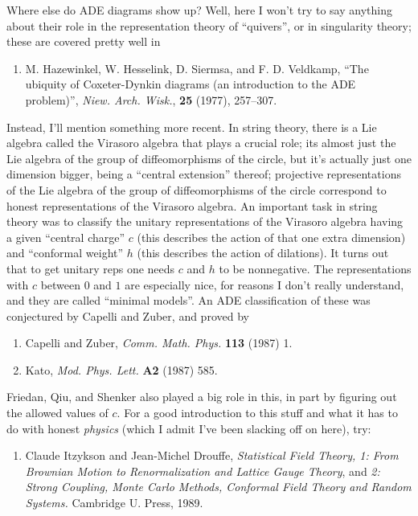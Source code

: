 \documentclass{article}
\def\tightlist{}
\begin{document}
Where else do ADE diagrams show up? Well, here I won't try to say
anything about their role in the representation theory of ``quivers'',
or in singularity theory; these are covered pretty well in

\begin{enumerate}
\def\labelenumi{\arabic{enumi})}
\setcounter{enumi}{5}
\tightlist
\item
  M. Hazewinkel, W. Hesselink, D. Siermsa, and F. D. Veldkamp, ``The
  ubiquity of Coxeter-Dynkin diagrams (an introduction to the ADE
  problem)'', \emph{Niew. Arch. Wisk.}, \textbf{25} (1977), 257--307.
\end{enumerate}

Instead, I'll mention something more recent. In string theory, there is
a Lie algebra called the Virasoro algebra that plays a crucial role; its
almost just the Lie algebra of the group of diffeomorphisms of the
circle, but it's actually just one dimension bigger, being a ``central
extension'' thereof; projective representations of the Lie algebra of
the group of diffeomorphisms of the circle correspond to honest
representations of the Virasoro algebra. An important task in string
theory was to classify the unitary representations of the Virasoro
algebra having a given ``central charge'' \(c\) (this describes the
action of that one extra dimension) and ``conformal weight'' \(h\) (this
describes the action of dilations). It turns out that to get unitary
reps one needs \(c\) and \(h\) to be nonnegative. The representations
with \(c\) between \(0\) and \(1\) are especially nice, for reasons I
don't really understand, and they are called ``minimal models''. An ADE
classification of these was conjectured by Capelli and Zuber, and proved
by

\begin{enumerate}
\def\labelenumi{\arabic{enumi})}
\setcounter{enumi}{6}
\item
  Capelli and Zuber, \emph{Comm. Math. Phys.} \textbf{113} (1987) 1.
\item
  Kato, \emph{Mod. Phys. Lett.} \textbf{A2} (1987) 585.
\end{enumerate}

Friedan, Qiu, and Shenker also played a big role in this, in part by
figuring out the allowed values of \(c\). For a good introduction to
this stuff and what it has to do with honest \emph{physics} (which I
admit I've been slacking off on here), try:

\begin{enumerate}
\def\labelenumi{\arabic{enumi})}
\setcounter{enumi}{8}
\tightlist
\item
  Claude Itzykson and Jean-Michel Drouffe, \emph{Statistical Field
  Theory, 1: From Brownian Motion to Renormalization and Lattice Gauge
  Theory}, and \emph{2: Strong Coupling, Monte Carlo Methods, Conformal
  Field Theory and Random Systems.} Cambridge U. Press, 1989.
\end{enumerate}
\end{document}
